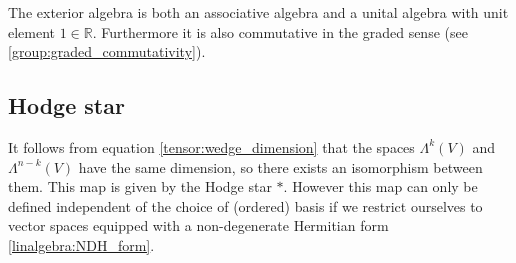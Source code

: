 	\begin{property}
		The exterior algebra is both an associative algebra and a unital algebra with unit element $1\in\mathbb{R}$. Furthermore it is also commutative in the graded sense (see \ref{group:graded_commutativity}).
	\end{property}
	
\subsection{Hodge star}
It follows from equation \ref{tensor:wedge_dimension} that the spaces $\Lambda^k(V)$ and $\Lambda^{n-k}(V)$ have the same dimension, so there exists an isomorphism between them. This map is given by the Hodge star $\ast$. However this map can only be defined independent of the choice of (ordered) basis if we restrict ourselves to vector spaces equipped with a non-degenerate Hermitian form \ref{linalgebra:NDH_form}.

	
